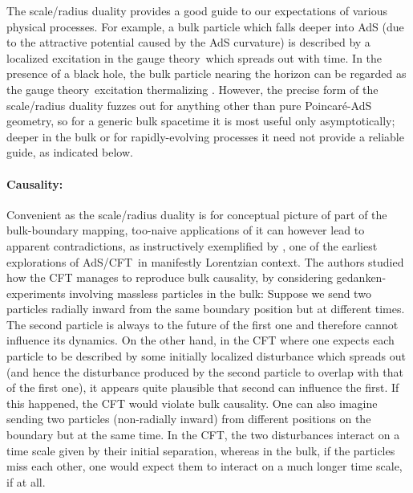 \documentclass[12pt]{article}
\def\AC{AdS/CFT}
\def\GT{gauge theory}
\def\Poinc{Poincar\' e}
\begin{document}
The scale/radius duality provides a good guide to our expectations of various physical processes.  For example, a bulk particle which falls deeper into AdS (due to the attractive potential caused by the AdS curvature) is described by a localized excitation in the \GT\ which spreads out with time.  In the presence of a black hole, the bulk particle nearing the horizon can be regarded as the \GT\ excitation thermalizing \cite{Banks:1998dd}.
However, the precise form of the scale/radius duality fuzzes out for anything other than pure \Poinc-AdS geometry, so for a generic bulk spacetime it is most useful only asymptotically; deeper in the bulk or for rapidly-evolving processes it need not provide a reliable guide, as indicated below.


\paragraph{Causality:}  %
Convenient as the scale/radius duality is for conceptual picture of part of the bulk-boundary mapping, too-naive applications of it  can however lead to apparent contradictions, as instructively exemplified by \cite{Horowitz:1999gf}, one of the earliest explorations of \AC\ in manifestly Lorentzian context.
The authors studied how the CFT manages to reproduce bulk causality, by considering gedanken-experiments involving massless particles in the bulk:  Suppose we send two particles radially inward from the same boundary position but at different times.  The second particle is always to the future of the first one and therefore cannot influence its dynamics.  On the other hand, in the CFT where one expects each particle to be described by  some initially localized disturbance which spreads out (and hence the disturbance produced by the second particle to overlap with that of the first one), it appears quite plausible that second can influence the first.  If this happened, the CFT would violate bulk causality.   One can also imagine sending two particles (non-radially inward) from different positions on the boundary but at the same time.  In the CFT, the two disturbances interact on a time scale given by their initial separation, whereas in the bulk, if the particles miss each other, one would  expect them to interact on a much longer time scale, if at all.
\end{document}

